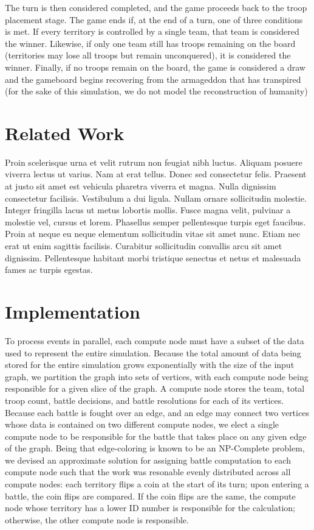 \documentclass[10pt]{article}
\begin{document}
\begin{multicols}{2}
		The turn is then considered completed, and the game proceeds back to the troop placement stage.
		The game ends if, at the end of a turn, one of three conditions is met. 
		If every territory is controlled by a single team, that team is considered the winner. 
		Likewise, if only one team still has troops remaining on the board (territories may lose all troops but remain unconquered), it is considered the winner.
		Finally, if no troops remain on the board, the game is considered a draw and the gameboard begins recovering from the armageddon that has transpired (for the sake of this simulation, we do not model the reconstruction of humanity)

		\section*{Related Work}
		Proin scelerisque urna et velit rutrum non feugiat nibh luctus. Aliquam posuere viverra lectus ut varius. Nam at erat tellus. Donec sed consectetur felis. Praesent at justo sit amet est vehicula pharetra viverra et magna. Nulla dignissim consectetur facilisis. Vestibulum a dui ligula. Nullam ornare sollicitudin molestie. Integer fringilla lacus ut metus lobortis mollis. Fusce magna velit, pulvinar a molestie vel, cursus et lorem. Phasellus semper pellentesque turpis eget faucibus. Proin at neque eu neque elementum sollicitudin vitae sit amet nunc. Etiam nec erat ut enim sagittis facilisis. Curabitur sollicitudin convallis arcu sit amet dignissim. Pellentesque habitant morbi tristique senectus et netus et malesuada fames ac turpis egestas.

		\section*{Implementation}
		To process events in parallel, each compute node must have a subset of the data used to represent the entire simulation.  
		Because the total amount of data being stored for the entire simulation grows exponentially with the size of the input graph, we partition the graph into sets of vertices, with each compute node being responsible for a given slice of the graph.  
		A compute node stores the team, total troop count, battle decisions, and battle resolutions for each of its vertices.
		Because each battle is fought over an edge, and an edge may connect two vertices whose data is contained on two different compute nodes, we elect a single compute node to be responsible for the battle that takes place on any given edge of the graph.
		Being that edge-coloring is known to be an NP-Complete problem, we devised an approximate solution for assigning battle computation to each compute node such that the work was resonable evenly distributed across all compute nodes: each territory flips a coin at the start of its turn; upon entering a battle, the coin flips are compared.  
		If the coin flips are the same, the compute node whose territory has a lower ID number is responsible for the calculation; otherwise, the other compute node is responsible.


\end{multicols}
\end{document}
